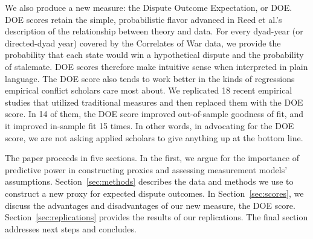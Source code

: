 We also produce a new measure:  the Dispute Outcome Expectation, or DOE.
DOE scores retain the simple, probabilistic flavor advanced in Reed et al.'s description of the relationship between theory and data.
For every dyad-year (or directed-dyad year) covered by the Correlates of War data, we provide the probability that each state would win a hypothetical dispute and the probability of stalemate.
DOE scores therefore make intuitive sense when interpreted in plain language.
The DOE score also tends to work better in the kinds of regressions empirical conflict scholars care most about.
We replicated 18 recent empirical studies that utilized traditional measures and then replaced them with the DOE score.  
In 14 of them, the DOE score improved out-of-sample goodness of fit, and it improved in-sample fit 15 times.
In other words, in advocating for the DOE score, we are not asking applied scholars to give anything up at the bottom line.

The paper proceeds in five sections.
In the first, we argue for the importance of predictive power in constructing proxies and assessing measurement models' assumptions.
Section~\ref{sec:methods} describes the data and methods we use to construct a new proxy for expected dispute outcomes.
In Section~\ref{sec:scores}, we discuss the advantages and disadvantages of our new measure, the DOE score.
Section~\ref{sec:replications} provides the results of our replications.
The final section addresses next steps and concludes.

